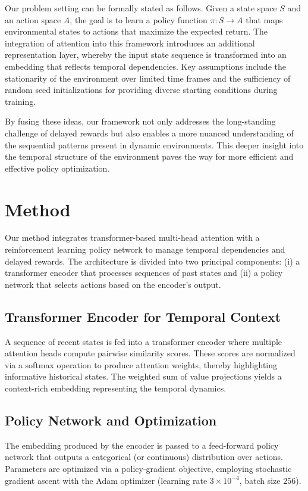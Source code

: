 \documentclass{article}
\begin{document}
Our problem setting can be formally stated as follows. Given a state space $S$ and an action space $A$, the goal is to learn a policy function $\pi: S \rightarrow A$ that maps environmental states to actions that maximize the expected return. The integration of attention into this framework introduces an additional representation layer, whereby the input state sequence is transformed into an embedding that reflects temporal dependencies. Key assumptions include the stationarity of the environment over limited time frames and the sufficiency of random seed initializations for providing diverse starting conditions during training.

By fusing these ideas, our framework not only addresses the long-standing challenge of delayed rewards but also enables a more nuanced understanding of the sequential patterns present in dynamic environments. This deeper insight into the temporal structure of the environment paves the way for more efficient and effective policy optimization.

\section{Method}
Our method integrates transformer-based multi-head attention with a reinforcement learning policy network to manage temporal dependencies and delayed rewards. The architecture is divided into two principal components: (i) a transformer encoder that processes sequences of past states and (ii) a policy network that selects actions based on the encoder’s output.

\subsection{Transformer Encoder for Temporal Context}
A sequence of recent states is fed into a transformer encoder where multiple attention heads compute pairwise similarity scores. These scores are normalized via a softmax operation to produce attention weights, thereby highlighting informative historical states. The weighted sum of value projections yields a context-rich embedding representing the temporal dynamics.

\subsection{Policy Network and Optimization}
The embedding produced by the encoder is passed to a feed-forward policy network that outputs a categorical (or continuous) distribution over actions. Parameters are optimized via a policy-gradient objective, employing stochastic gradient ascent with the Adam optimizer (learning rate $3\times10^{-4}$, batch size $256$).
\end{document}
